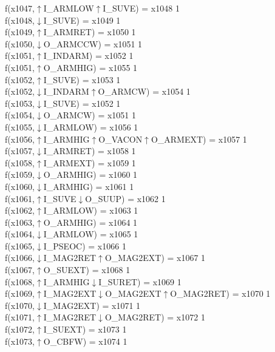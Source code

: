 f(x1047,$\uparrow$I\_ARMLOW$\uparrow$I\_SUVE) = x1048 {1} \\
f(x1048,$\downarrow$I\_SUVE) = x1049 {1} \\
f(x1049,$\uparrow$I\_ARMRET) = x1050 {1} \\
f(x1050,$\downarrow$O\_ARMCCW) = x1051 {1} \\
f(x1051,$\uparrow$I\_INDARM) = x1052 {1} \\
f(x1051,$\uparrow$O\_ARMHIG) = x1055 {1} \\
f(x1052,$\uparrow$I\_SUVE) = x1053 {1} \\
f(x1052,$\downarrow$I\_INDARM$\uparrow$O\_ARMCW) = x1054 {1} \\
f(x1053,$\downarrow$I\_SUVE) = x1052 {1} \\
f(x1054,$\downarrow$O\_ARMCW) = x1051 {1} \\
f(x1055,$\downarrow$I\_ARMLOW) = x1056 {1} \\
f(x1056,$\uparrow$I\_ARMHIG$\uparrow$O\_VACON$\uparrow$O\_ARMEXT) = x1057 {1} \\
f(x1057,$\downarrow$I\_ARMRET) = x1058 {1} \\
f(x1058,$\uparrow$I\_ARMEXT) = x1059 {1} \\
f(x1059,$\downarrow$O\_ARMHIG) = x1060 {1} \\
f(x1060,$\downarrow$I\_ARMHIG) = x1061 {1} \\
f(x1061,$\uparrow$I\_SUVE$\downarrow$O\_SUUP) = x1062 {1} \\
f(x1062,$\uparrow$I\_ARMLOW) = x1063 {1} \\
f(x1063,$\uparrow$O\_ARMHIG) = x1064 {1} \\
f(x1064,$\downarrow$I\_ARMLOW) = x1065 {1} \\
f(x1065,$\downarrow$I\_PSEOC) = x1066 {1} \\
f(x1066,$\downarrow$I\_MAG2RET$\uparrow$O\_MAG2EXT) = x1067 {1} \\
f(x1067,$\uparrow$O\_SUEXT) = x1068 {1} \\
f(x1068,$\uparrow$I\_ARMHIG$\downarrow$I\_SURET) = x1069 {1} \\
f(x1069,$\uparrow$I\_MAG2EXT$\downarrow$O\_MAG2EXT$\uparrow$O\_MAG2RET) = x1070 {1} \\
f(x1070,$\downarrow$I\_MAG2EXT) = x1071 {1} \\
f(x1071,$\uparrow$I\_MAG2RET$\downarrow$O\_MAG2RET) = x1072 {1} \\
f(x1072,$\uparrow$I\_SUEXT) = x1073 {1} \\
f(x1073,$\uparrow$O\_CBFW) = x1074 {1} \\
